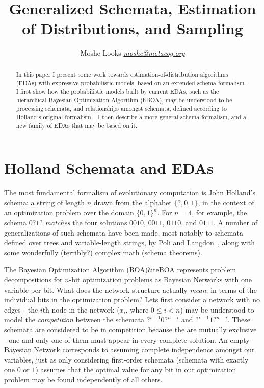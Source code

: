 \documentclass[letterpaper]{article}
\begin{document}
\title{Generalized Schemata, Estimation of Distributions, and Sampling}
\author{
  Moshe Looks
  \href{mailto:moshe@metacog.org}{\emph{moshe@metacog.org}}
}
\maketitle

\begin{abstract}
  In this paper I present some work towards estimation-of-distribution
  algorithms (EDAs) with expressive probabilistic models, based on an
  extended schema formalism. I first show how the probabilistic models built by
  current EDAs, such as the hierarchical Bayesian Optimization Algorithm
  (hBOA), may be understood to be processing schemata, and relationships
  amongst schemata, defined according to Holland's original
  formalism~\cite{Holland}. I then describe a more general schema formalism,
  and a new family of EDAs that may be based on it.
\end{abstract}

\section{Holland Schemata and EDAs}

The most fundamental formalism of evolutionary computation is John Holland's
schema: a string of length $n$ drawn from the alphabet $\{?,0,1\}$, in the
context of an optimization problem over the domain $\{0,1\}^n$. For $n=4$, for
example, the schema $0?1?$ \emph{matches} the four solutions $0010$, $0011$,
$0110$, and $0111$. A number of generalizations of such schemata have been
made, most notably to schemata defined over trees and variable-length strings,
by Poli and Langdon~\cite{FOGP}, along with some wonderfully (terribly?)
complex math (schema theorems).

The Bayesian Optimization Algorithm (BOA)\~cite{BOA} represents problem
decompositions for $n$-bit optimization problems as Bayesian Networks with one
variable per bit. What does the network structure actually \emph{mean}, in
terms of the individual bits in the optimization problem? Lets first consider a
network with no edges - the $i$th node in the network ($x_i$, where $0 \leq i <
n$) may be understood to model the \emph{competition} between the schemata
$?^{i-1}0?^{n-i}$ and $?^{i-1}1?^{n-i}$. These schemata are considered to be in
competition because the are mutually exclusive - one and only one of them must
appear in every complete solution. An empty Bayesian Network corresponds to
assuming complete independence amongst our variables, just as only considering
first-order schemata (schemata with exactly one $0$ or $1$) assumes that the
optimal value for any bit in our optimization problem may be found
independently of all others.
\end{document}
